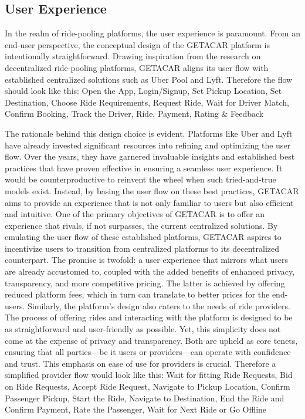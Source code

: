 \subsection{User Experience}
In the realm of ride-pooling platforms, the user experience is paramount. From an end-user perspective, the conceptual design of the GETACAR platform is intentionally straightforward. Drawing inspiration from the research on decentralized ride-pooling platforms, GETACAR aligns its user flow with established centralized solutions such as Uber Pool and Lyft.
Therefore the flow should look like this: Open the App, Login/Signup, Set Pickup Location, Set Destination, Choose Ride Requirements, Request Ride, Wait for Driver Match, Confirm Booking, Track the Driver, Ride, Payment, Rating \& Feedback

The rationale behind this design choice is evident. Platforms like Uber and Lyft have already invested significant resources into refining and optimizing the user flow. Over the years, they have garnered invaluable insights and established best practices that have proven effective in ensuring a seamless user experience. It would be counterproductive to reinvent the wheel when such tried-and-true models exist. Instead, by basing the user flow on these best practices, GETACAR aims to provide an experience that is not only familiar to users but also efficient and intuitive. 
One of the primary objectives of GETACAR is to offer an experience that rivals, if not surpasses, the current centralized solutions. By emulating the user flow of these established platforms, GETACAR aspires to incentivize users to transition from centralized platforms to its decentralized counterpart. The promise is twofold: a user experience that mirrors what users are already accustomed to, coupled with the added benefits of enhanced privacy, transparency, and more competitive pricing. The latter is achieved by offering reduced platform fees, which in turn can translate to better prices for the end-users. 
Similarly, the platform's design also caters to the needs of ride providers. The process of offering rides and interacting with the platform is designed to be as straightforward and user-friendly as possible. Yet, this simplicity does not come at the expense of privacy and transparency. Both are upheld as core tenets, ensuring that all parties—be it users or providers—can operate with confidence and trust. This emphasis on ease of use for providers is crucial. Therefore a simplified provider flow would look like this: Wait for fitting Ride Requests, Bid on Ride Requests, Accept Ride Request, Navigate to Pickup Location, Confirm Passenger Pickup, Start the Ride, Navigate to Destination, End the Ride and Confirm Payment, Rate the Passenger, Wait for Next Ride or Go Offline

